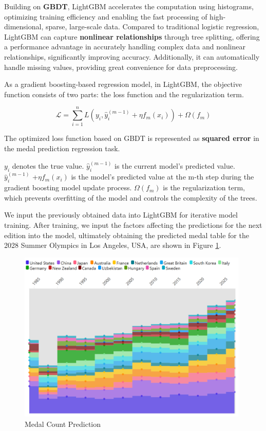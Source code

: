 \documentclass[12pt]{article}  %
\begin{document}
Building on \textbf{GBDT}, LightGBM accelerates the computation using histograms, optimizing training efficiency and enabling the fast processing of high-dimensional, sparse, large-scale data. Compared to traditional logistic regression, LightGBM can capture \textbf{nonlinear relationships} through tree splitting, offering a performance advantage in accurately handling complex data and nonlinear relationships, significantly improving accuracy. Additionally, it can automatically handle missing values, providing great convenience for data preprocessing.

As a gradient boosting-based regression model, in LightGBM, the objective function consists of two parts: the loss function and the regularization term.

\begin{equation}
	\mathcal{L} = \sum_{i=1}^{n} L(y_i, \hat{y}_i^{(m-1)} + \eta f_m(x_i)) + \Omega(f_m)
\end{equation}

The optimized loss function based on GBDT is represented as \textbf{squared error} in the medal prediction regression task.

$y_i$ denotes the true value.
$\hat{y}_i^{(m-1)}$ is the current model's predicted value.
$\hat{y}_i^{(m-1)}$ +$\eta f_m(x_i)$ is the model's predicted value at the m-th step during the gradient boosting model update process.
$\Omega(f_m)$ is the regularization term, which prevents overfitting of the model and controls the complexity of the trees.

We input the previously obtained data into LightGBM for iterative model training. After training, we input the factors affecting the predictions for the next edition into the model, ultimately obtaining the predicted medal table for the 2028 Summer Olympics in Los Angeles, USA, are shown in Figure \ref{fig:aa}.
\begin{figure}[H]
	\centering
	\includegraphics[width=11cm]{img/Predict.png}
	\caption{Medal Count Prediction}
	\label{fig:aa}
\end{figure}
\end{document}
